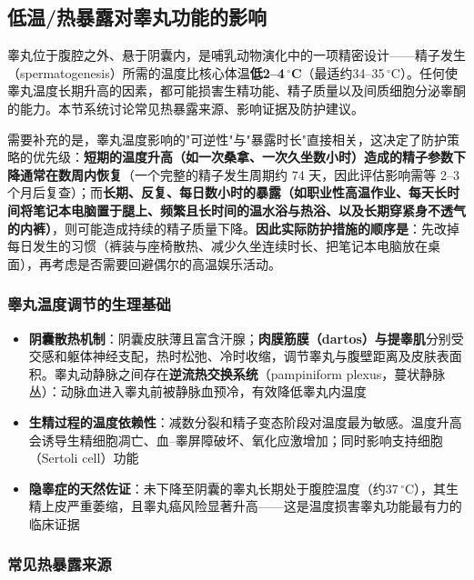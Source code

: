 \documentclass[12pt,a4paper,twoside]{ctexbook}
\begin{document}
\subsection{低温/热暴露对睾丸功能的影响}
\label{subsec:testicular_temperature}

睾丸位于腹腔之外、悬于阴囊内，是哺乳动物演化中的一项精密设计——精子发生（spermatogenesis）所需的温度比核心体温\textbf{低2--4\,$^\circ$C}（最适约34--35\,$^\circ$C）。任何使睾丸温度长期升高的因素，都可能损害生精功能、精子质量以及间质细胞分泌睾酮的能力。本节系统讨论常见热暴露来源、影响证据及防护建议。


需要补充的是，睾丸温度影响的"可逆性"与"暴露时长"直接相关，这决定了防护策略的优先级：\textbf{短期的温度升高（如一次桑拿、一次久坐数小时）造成的精子参数下降通常在数周内恢复}（一个完整的精子发生周期约 74 天，因此评估影响需等 2--3 个月后复查）；而\textbf{长期、反复、每日数小时的暴露（如职业性高温作业、每天长时间将笔记本电脑置于腿上、频繁且长时间的温水浴与热浴、以及长期穿紧身不透气的内裤）}，则可能造成持续的精子质量下降。\textbf{因此实际防护措施的顺序是}：先改掉每日发生的习惯（裤装与座椅散热、减少久坐连续时长、把笔记本电脑放在桌面），再考虑是否需要回避偶尔的高温娱乐活动。

\subsubsection{睾丸温度调节的生理基础}

\begin{itemize}[leftmargin=2cm]
	\item \textbf{阴囊散热机制}：阴囊皮肤薄且富含汗腺；\textbf{肉膜筋膜（dartos）与提睾肌}分别受交感和躯体神经支配，热时松弛、冷时收缩，调节睾丸与腹壁距离及皮肤表面积。睾丸动静脉之间存在\textbf{逆流热交换系统}（pampiniform plexus，蔓状静脉丛）：动脉血进入睾丸前被静脉血预冷，有效降低睾丸内温度
	\item \textbf{生精过程的温度依赖性}：减数分裂和精子变态阶段对温度最为敏感。温度升高会诱导生精细胞凋亡、血--睾屏障破坏、氧化应激增加；同时影响支持细胞（Sertoli cell）功能
	\item \textbf{隐睾症的天然佐证}：未下降至阴囊的睾丸长期处于腹腔温度（约37\,$^\circ$C），其生精上皮严重萎缩，且睾丸癌风险显著升高——这是温度损害睾丸功能最有力的临床证据
\end{itemize}

\subsubsection{常见热暴露来源}
\end{document}
